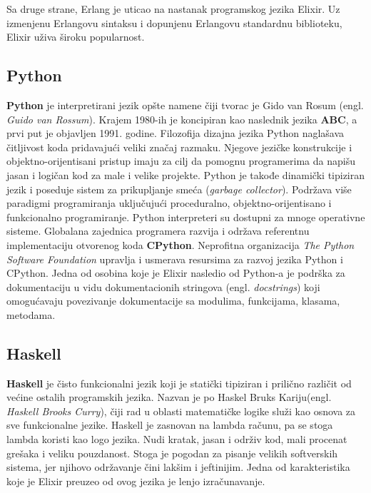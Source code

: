 \documentclass[12pt,oneside]{memoir}
\begin{document}
Sa druge strane, Erlang je uticao na nastanak programskog jezika Elixir. Uz izmenjenu Erlangovu sintaksu i dopunjenu Erlangovu standardnu biblioteku, Elixir uživa široku popularnost.
     
\begin{comment} U funkcionalnom programiranju, funkcije se primenjuju na argumente i vrednosti. Vraćene vrednosti se koriste kao argumenti za druge funkcije. Funkcionalno programiranje je suprotno proceduralnom programiranju, gde se koriste naredbe koje menjaju okruženje programa na neki način, kao što je pripisivanje vrednosti promenljivim. U funkcionalnom programiranju, te promene okruženja se minimizuju korišćenjem vrednosti koje vraća pozvana funkcija kao direktan ulaz u drugu funkciju, bez upotrebe pripisivanja naredbi.\\
\end{comment}

\subsection{Python}
\textbf{Python} je interpretirani jezik opšte namene čiji tvorac je Gido van Rosum (engl. \textit{Guido van Rossum}). Krajem 1980-ih je koncipiran kao naslednik jezika \textbf{ABC}, a prvi put je objavljen 1991. godine. Filozofija dizajna jezika Python naglašava čitljivost koda pridavajući veliki značaj razmaku. Njegove jezičke konstrukcije i objektno-orijentisani pristup imaju za cilj da pomognu programerima da napišu jasan i logičan kod za male i velike projekte. Python je takođe dinamički tipiziran jezik i poseduje sistem za prikupljanje smeća (\textit{garbage collector}). Podržava više paradigmi programiranja uključujući proceduralno, objektno-orijentisano i funkcionalno programiranje. Python interpreteri su dostupni za mnoge operativne sisteme. Globalana zajednica programera razvija i održava referentnu implementaciju otvorenog koda \textbf{CPython}. Neprofitna organizacija \textit{The Python Software Foundation} upravlja i usmerava resursima za razvoj jezika Python i CPython. Jedna od osobina koje je Elixir nasledio od Python-a je podrška za dokumentaciju u vidu dokumentacionih stringova (engl. \textit{docstrings}) koji omogućavaju povezivanje dokumentacije sa modulima, funkcijama, klasama, metodama.

\subsection{Haskell}
\textbf{Haskell} je čisto funkcionalni jezik koji je statički tipiziran i prilično različit od većine ostalih programskih jezika. Nazvan je po Haskel Bruks Kariju(engl. \textit{Haskell Brooks Curry}), čiji rad u oblasti matematičke logike služi kao osnova za sve funkcionalne jezike. Haskell je zasnovan na lambda računu, pa se stoga lambda koristi kao logo jezika. Nudi kratak, jasan i održiv kod, mali procenat grešaka i veliku pouzdanost. Stoga je pogodan za pisanje velikih softverskih sistema, jer njihovo održavanje čini lakšim i jeftinijim. Jedna od karakteristika koje je Elixir preuzeo od ovog jezika je lenjo izračunavanje.
\end{document}
